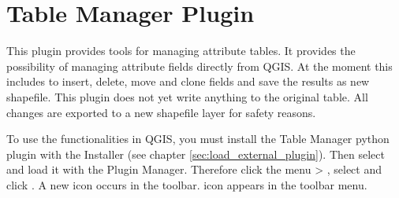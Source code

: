 
\section{Table Manager Plugin}
\label{sec:table_manager}


This plugin provides tools for managing attribute tables. It provides the 
possibility of managing attribute fields directly from QGIS. At the moment 
this includes to insert, delete, move and clone fields and save the results 
as new shapefile. This plugin does not yet write anything to the original 
table. All changes are exported to a new shapefile layer for safety reasons.


To use the functionalities in QGIS, you must install the Table Manager python 
plugin with the  Installer (see chapter 
\ref{sec:load_external_plugin}). Then select and load it with the Plugin Manager. 
Therefore click the menu  > 
, select  and click 
. A new  icon occurs 
in the toolbar. icon appears in the toolbar menu.





